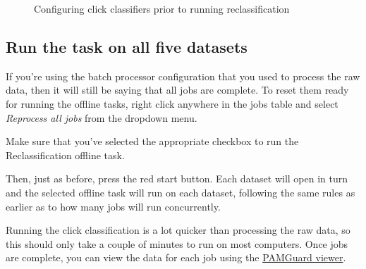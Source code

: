 \documentclass[
]{article}
\begin{document}
\begin{figure}
\begin{minipage}{0.55\linewidth}
{}


\end{minipage}%

\caption{\label{fig-reclass}Configuring click classifiers prior to
running reclassification}

\end{figure}%

\subsection{Run the task on all five
datasets}\label{run-the-task-on-all-five-datasets}

If you're using the batch processor configuration that you used to
process the raw data, then it will still be saying that all jobs are
complete. To reset them ready for running the offline tasks, right click
anywhere in the jobs table and select \emph{Reprocess all jobs} from the
dropdown menu.

Make sure that you've selected the appropriate checkbox to run the
Reclassification offline task.

Then, just as before, press the red start button. Each dataset will open
in turn and the selected offline task will run on each dataset,
following the same rules as earlier as to how many jobs will run
concurrently.

Running the click classification is a lot quicker than processing the
raw data, so this should only take a couple of minutes to run on most
computers. Once jobs are complete, you can view the data for each job
using the
\href{https://www.pamguard.org/olhelp/overview/PamMasterHelp/docs/viewerMode.html}{PAMGuard
viewer}.
\end{document}
